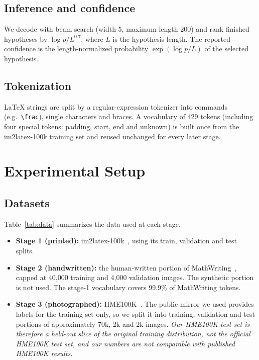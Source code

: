 \documentclass[conference]{IEEEtran}
\begin{document}
\subsection{Inference and confidence}
We decode with beam search (width 5, maximum length 200) and rank finished hypotheses by $\log p / L^{0.7}$, where $L$ is the hypothesis length. The reported confidence is the length-normalized probability $\exp(\log p / L)$ of the selected hypothesis.

\subsection{Tokenization}
\LaTeX{} strings are split by a regular-expression tokenizer into commands (e.g.\ \verb|\frac|), single characters and braces. A vocabulary of 429 tokens (including four special tokens: padding, start, end and unknown) is built once from the im2latex-100k training set and reused unchanged for every later stage.

\section{Experimental Setup}\label{sec:setup}

\subsection{Datasets}
Table~\ref{tab:data} summarizes the data used at each stage.
\begin{itemize}
\item \textbf{Stage 1 (printed):} im2latex-100k~\cite{deng2017im2markup}, using its train, validation and test splits.
\item \textbf{Stage 2 (handwritten):} the human-written portion of MathWriting~\cite{mathwriting}, capped at 40{,}000 training and 4{,}000 validation images. The synthetic portion is not used. The stage-1 vocabulary covers 99.9\% of MathWriting tokens.
\item \textbf{Stage 3 (photographed):} HME100K~\cite{hme100k}. The public mirror we used provides labels for the training set only, so we split it into training, validation and test portions of approximately 70k, 2k and 2k images. \emph{Our HME100K test set is therefore a held-out slice of the original training distribution, not the official HME100K test set, and our numbers are not comparable with published HME100K results.}
\end{itemize}
\end{document}
